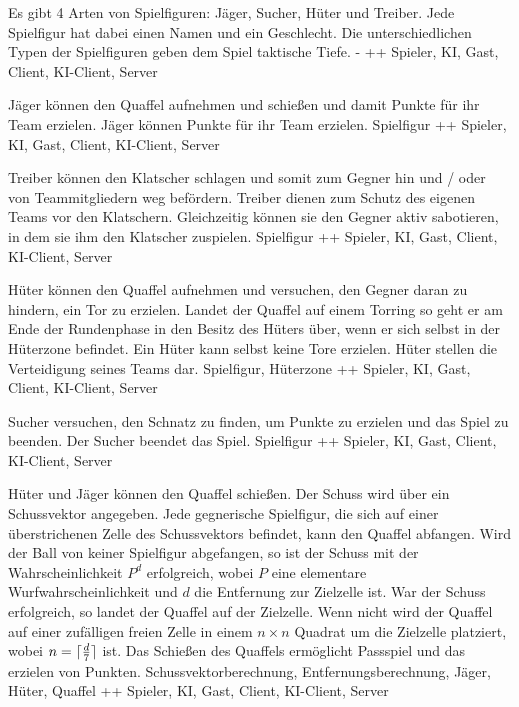         {Es gibt 4 Arten von Spielfiguren: Jäger, Sucher, Hüter und Treiber. Jede Spielfigur hat dabei einen Namen und ein Geschlecht.}
        {Die unterschiedlichen Typen der Spielfiguren geben dem Spiel taktische Tiefe.}
        {-}
        {++}
        {Spieler, KI, Gast, Client, KI-Client, Server}

        {Jäger können den Quaffel aufnehmen und schießen und damit Punkte für ihr Team erzielen.}
        {Jäger können Punkte für ihr Team erzielen.}
        {Spielfigur}
        {++}
        {Spieler, KI, Gast, Client, KI-Client, Server}

        {Treiber können den Klatscher schlagen und somit zum Gegner hin und / oder von Teammitgliedern weg befördern.}
        {Treiber dienen zum Schutz des eigenen Teams vor den Klatschern. Gleichzeitig können sie den Gegner aktiv sabotieren, in dem sie ihm den Klatscher zuspielen.}
        {Spielfigur}
        {++}
        {Spieler, KI, Gast, Client, KI-Client, Server}

        {Hüter können den Quaffel aufnehmen und versuchen, den Gegner daran zu hindern, ein Tor zu erzielen. Landet der Quaffel auf einem Torring so geht er am Ende der Rundenphase in den Besitz des Hüters über, wenn er sich selbst in der Hüterzone befindet. Ein Hüter kann selbst keine Tore erzielen.}
        {Hüter stellen die Verteidigung seines Teams dar.}
        {Spielfigur, Hüterzone}
        {++}
        {Spieler, KI, Gast, Client, KI-Client, Server}

        {Sucher versuchen, den Schnatz zu finden, um Punkte zu erzielen und das Spiel zu beenden.}
        {Der Sucher beendet das Spiel.}
        {Spielfigur}
        {++}
        {Spieler, KI, Gast, Client, KI-Client, Server}
        
        {Hüter und Jäger können den Quaffel schießen. Der Schuss wird über ein Schussvektor angegeben. Jede gegnerische Spielfigur, die sich auf einer überstrichenen Zelle des Schussvektors befindet, kann den Quaffel abfangen. Wird der Ball von keiner Spielfigur abgefangen, so ist der Schuss mit der Wahrscheinlichkeit $P^d$ erfolgreich, wobei $P$ eine elementare Wurfwahrscheinlichkeit und $d$ die Entfernung zur Zielzelle ist. War der Schuss erfolgreich, so landet der Quaffel auf der Zielzelle. Wenn nicht wird der Quaffel auf einer zufälligen freien Zelle in einem $n\times n$ Quadrat um die Zielzelle platziert, wobei $n=\lceil \frac{d}{7}\rceil$ ist.}			
        {Das Schießen des Quaffels ermöglicht Passspiel und das erzielen von Punkten.}
        {Schussvektorberechnung, Entfernungsberechnung, Jäger, Hüter, Quaffel}
        {++}
        {Spieler, KI, Gast, Client, KI-Client, Server}
        
